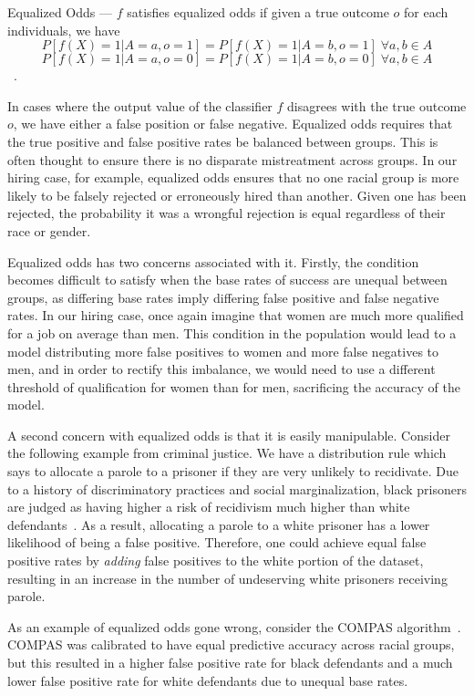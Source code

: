 \begin{definition}
    Equalized Odds — $f$ satisfies equalized odds if given a true outcome $o$
    for each individuals, we have
    \[P[f(X)=1|A=a, o=1] = P[f(X)=1|A=b, o=1]\;\forall a, b\in A\]
    \[P[f(X)=1|A=a, o=0] = P[f(X)=1|A=b, o=0]\;\forall a, b\in A\]~\citep{Hardt_2016}.
\end{definition}

In cases where the output value of the classifier $f$ disagrees with the true
outcome $o$, we have either a false position or false negative. 
Equalized odds requires that the true positive and false positive rates be
balanced between groups. This is often thought to ensure there is no disparate 
mistreatment across groups. In our hiring case, for example, equalized odds
ensures that no one racial group is more likely to be falsely rejected or
erroneously hired than another. Given one has been rejected, the probability it
was a wrongful rejection is equal regardless of their race or gender.

Equalized odds has two concerns associated with it. Firstly, the condition
becomes difficult to satisfy when the base rates of success are unequal between
groups, as differing base rates imply differing false positive and false
negative rates. In our hiring case, once again imagine that women are much more
qualified for a job on average than men. This condition in the population
would lead to a model distributing more false positives to women and more false
negatives to men, and in order to rectify this imbalance, we would need to use
a different threshold of qualification for women than for men, sacrificing the
accuracy of the model.

A second concern with equalized odds is that it is easily manipulable. Consider
the following example from criminal justice. We have a distribution rule which
says to allocate a parole to a prisoner if they are very unlikely to recidivate.
Due to a history of discriminatory practices and social marginalization, black
prisoners are judged as having higher a risk of recidivism much higher than
white defendants~\citep{CrimeJustice_2023}. As a result, allocating a parole to 
a white prisoner has a lower likelihood of being a false positive. Therefore,
one could achieve equal false positive rates by \textit{adding} false
positives to the white portion of the dataset, resulting in an increase in the
number of undeserving white prisoners receiving parole.

As an example of equalized odds gone wrong, consider the COMPAS
algorithm~\citep{Angwin_2016}. COMPAS was calibrated to have equal predictive
accuracy across racial groups, but this resulted in a higher false positive rate
for black defendants and a much lower false positive rate for white defendants
due to unequal base rates.

